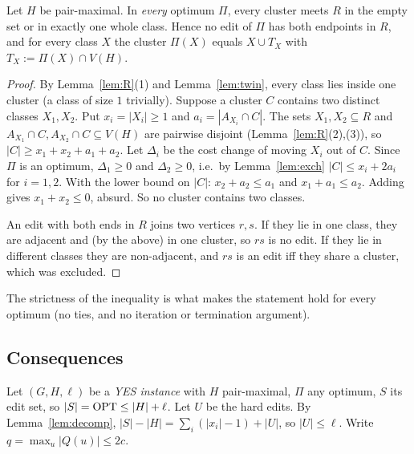\begin{theorem}\label{thm:C1}
Let $H$ be pair-maximal. In \emph{every} optimum $\Pi$, every cluster meets $R$ in the empty set or in exactly one whole class. Hence no edit of $\Pi$ has both endpoints in $R$, and for every class $X$ the cluster $\Pi(X)$ equals $X\cup T_X$ with $T_X:=\Pi(X)\cap V(H)$.
\end{theorem}
\begin{proof}
By Lemma~\ref{lem:R}(1) and Lemma~\ref{lem:twin}, every class lies inside one cluster (a class of size $1$ trivially). Suppose a cluster $C$ contains two distinct classes $X_1,X_2$. Put $x_i=|X_i|\ge1$ and $a_i=|A_{X_i}\cap C|$. The sets $X_1,X_2\subseteq R$ and $A_{X_1}\cap C,A_{X_2}\cap C\subseteq V(H)$ are pairwise disjoint (Lemma~\ref{lem:R}(2),(3)), so $|C|\ge x_1+x_2+a_1+a_2$. Let $\Delta_i$ be the cost change of moving $X_i$ out of $C$. Since $\Pi$ is an optimum, $\Delta_1\ge0$ and $\Delta_2\ge0$, i.e.\ by Lemma~\ref{lem:exch} $|C|\le x_i+2a_i$ for $i=1,2$. With the lower bound on $|C|$: $x_2+a_2\le a_1$ and $x_1+a_1\le a_2$. Adding gives $x_1+x_2\le0$, absurd. So no cluster contains two classes.

An edit with both ends in $R$ joins two vertices $r,s$. If they lie in one class, they are adjacent and (by the above) in one cluster, so $rs$ is no edit. If they lie in different classes they are non-adjacent, and $rs$ is an edit iff they share a cluster, which was excluded.
\end{proof}
The strictness of the inequality is what makes the statement hold for every optimum (no ties, and no iteration or termination argument).

\subsection{Consequences}\label{sec:conseq}
Let $(G,H,\ell)$ be a \emph{YES instance} with $H$ pair-maximal, $\Pi$ any optimum, $S$ its edit set, so $|S|=\mathrm{OPT}\le|H|+\ell$. Let $U$ be the hard edits. By Lemma~\ref{lem:decomp}, $|S|-|H|=\sum_i(|x_i|-1)+|U|$, so $|U|\le\ell$.  Write $q=\max_u|Q(u)|\le 2c$.


